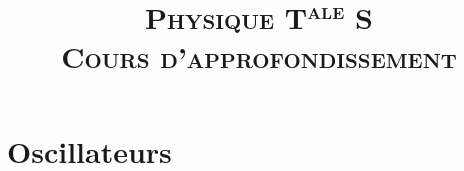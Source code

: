 \documentclass{article}
\title{
    \textsc{
        Physique T\textsuperscript{ale} S \\ Cours d'approfondissement
    }
}
\author{}
\theoremstyle{definition}
\theoremstyle{plain}
\theoremstyle{remark}
\newcommand{\onlyinsubfile}[1]{#1}
\newcommand{\notinsubfile}[1]{}
\begin{document}
\renewcommand{\onlyinsubfile}[1]{}
\renewcommand{\notinsubfile}[1]{#1}

\maketitle

\part{Oscillateurs}

    
\end{document}
